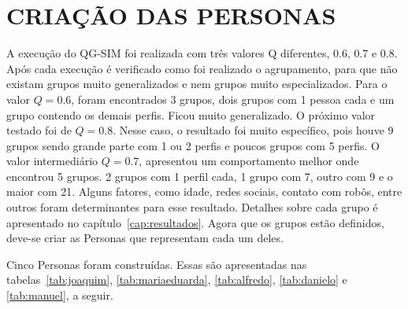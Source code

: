 \section{CRIAÇÃO DAS PERSONAS}
\label{sec:ec_personas}
A execução do QG-SIM foi realizada com três valores Q diferentes, 0.6, 0.7 e 0.8. Após cada execução é verificado como foi realizado o agrupamento, para que não existam grupos muito generalizados e nem grupos muito especializados. Para o valor $Q = 0.6$, foram encontrados 3 grupos, dois grupos com 1 pessoa cada e um grupo contendo os demais perfis. Ficou muito generalizado. O próximo valor testado foi de $Q = 0.8$. Nesse caso, o resultado foi muito específico, pois houve 9 grupos sendo grande parte com 1 ou 2 perfis e poucos grupos com 5 perfis. O valor intermediário $Q = 0.7$, apresentou um comportamento melhor onde encontrou 5 grupos. 2 grupos com 1 perfil cada, 1 grupo com 7, outro com 9 e o maior com 21. Alguns fatores, como idade, redes sociais, contato com robôs, entre outros foram determinantes para esse resultado. Detalhes sobre cada grupo é apresentado no capítulo~\ref{cap:resultados}. Agora que os grupos estão definidos, deve-se criar as Personas que representam cada um deles. 

Cinco Personas foram construídas. Essas são apresentadas nas tabelas~\ref{tab:joaquim}, \ref{tab:mariaeduarda}, \ref{tab:alfredo}, \ref{tab:danielo} e \ref{tab:manuel}, a seguir.

